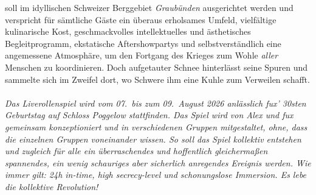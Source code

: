 \game{} soll im idyllischen Schweizer Berggebiet \emph{Graubünden} ausgerichtet
werden und verspricht für sämtliche Gäste ein überaus erholsames Umfeld,
vielfältige kulinarische Kost, geschmackvolles intellektuelles und
ästhetisches Begleitprogramm, ekstatische Aftershowpartys und
selbstverständlich eine angemessene Atmosphäre, um den Fortgang des Krieges zum
Wohle \emph{aller} Menschen zu koordinieren. Doch aufgetauter Schnee hinterlässt
seine Spuren und sammelte sich im Zweifel dort, wo Schwere ihm eine Kuhle zum
Verweilen schafft.\\\\
%
\emph{Das Liverollenspiel \game{} wird vom 07.~bis zum 09.~August 2026
anlässlich fux' 30sten Geburtstag auf Schloss Poggelow stattfinden. Das Spiel
wird von Alex und fux gemeinsam konzeptioniert und in verschiedenen Gruppen
mitgestaltet, ohne, dass die einzelnen Gruppen voneinander wissen. So soll das
Spiel kollektiv entstehen und zugleich für alle ein überraschendes und
hoffentlich gleichermaßen spannendes, ein wenig schauriges aber sicherlich
anregendes Ereignis werden. Wie immer gilt: 24h in-time, high secrecy-level und
schonungslose Immersion. Es lebe die kollektive Revolution!}
\bigskip
\bigskip
\bigskip
{}
